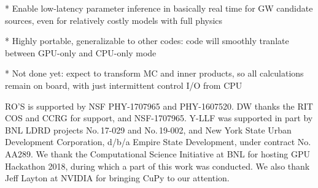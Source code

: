 \documentclass[twocolumn,prd,nofootinbib]{revtex4}
\begin{document}
* Enable low-latency parameter inference in basically real time for GW candidate sources, even for relatively costly
models with full physics


* Highly portable, generalizable to other codes: code will smoothly tranlate between GPU-only and CPU-only mode


* Not done yet: expect to transform MC and inner products, so all calculations remain on board, with just intermittent
control I/O from CPU


\begin{acknowledgements}
RO'S is supported by NSF PHY-1707965 and PHY-1607520.
DW thanks the RIT COS and CCRG for support, and  NSF-1707965.
Y-LLF was supported in part by BNL LDRD projects No.\,17-029 and No.\,19-002, 
and New York State Urban Development Corporation, d/b/a Empire State Development, under contract No.\,AA289.
We thank the Computational Science Initiative at BNL for hosting GPU Hackathon 2018, during which a part of this work was conducted. We also thank Jeff Layton at NVIDIA for bringing CuPy to our attention.
\end{acknowledgements}



\end{document}
